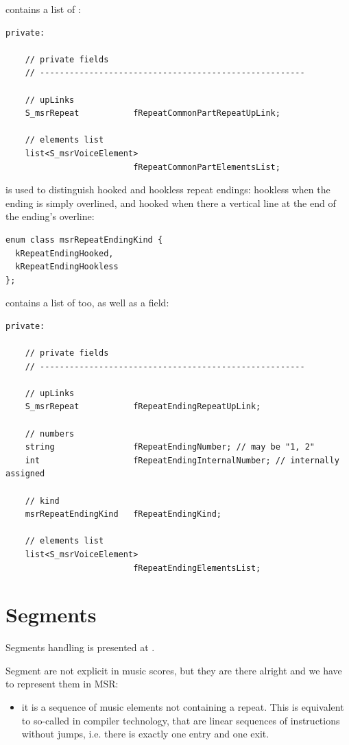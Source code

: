  contains a list of :
\begin{lstlisting}[language=CPlusPlus]
  private:

    // private fields
    // ------------------------------------------------------

    // upLinks
    S_msrRepeat           fRepeatCommonPartRepeatUpLink;

    // elements list
    list<S_msrVoiceElement>
                          fRepeatCommonPartElementsList;
\end{lstlisting}

 is used to distinguish hooked and hookless repeat endings: hookless when the ending is simply overlined, and hooked when there a vertical line at the end of the ending's overline:
\begin{lstlisting}[language=CPlusPlus]
enum class msrRepeatEndingKind {
  kRepeatEndingHooked,
  kRepeatEndingHookless
};
\end{lstlisting}

 contains a list of  too, as well as a  field:
\begin{lstlisting}[language=CPlusPlus]
  private:

    // private fields
    // ------------------------------------------------------

    // upLinks
    S_msrRepeat           fRepeatEndingRepeatUpLink;

    // numbers
    string                fRepeatEndingNumber; // may be "1, 2"
    int                   fRepeatEndingInternalNumber; // internally assigned

    // kind
    msrRepeatEndingKind   fRepeatEndingKind;

    // elements list
    list<S_msrVoiceElement>
                          fRepeatEndingElementsList;
\end{lstlisting}


\section{Segments}\label{Segments}

Segments handling is presented at .

Segment are not explicit in music scores, but they are there alright and we have to represent them in MSR:
\begin{itemize}
\item it is a sequence of music elements not containing a repeat. This is equivalent to so-called  in compiler technology, that are linear sequences of instructions without jumps, i.e. there is exactly one entry and one exit.%
\end{itemize}

